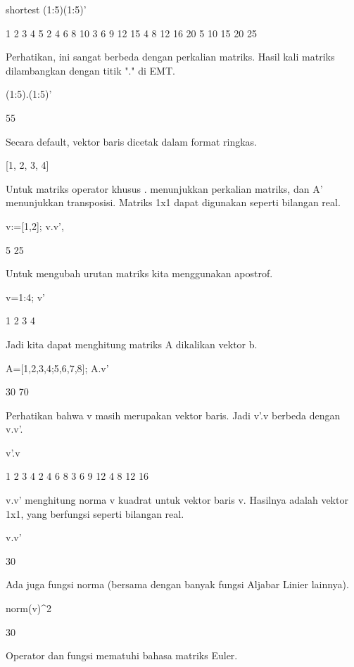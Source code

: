 \documentclass{article}
\begin{document}
\>shortest (1:5)\*(1:5)'


         1      2      3      4      5 
         2      4      6      8     10 
         3      6      9     12     15 
         4      8     12     16     20 
         5     10     15     20     25 

Perhatikan, ini sangat berbeda dengan perkalian matriks. Hasil kali
matriks dilambangkan dengan titik "." di EMT.


\>(1:5).(1:5)'


    55

Secara default, vektor baris dicetak dalam format ringkas.


\>[1,2,3,4]


    [1,  2,  3,  4]

Untuk matriks operator khusus . menunjukkan perkalian matriks, dan A'
menunjukkan transposisi. Matriks 1x1 dapat digunakan seperti bilangan
real.


\>v:=[1,2]; v.v', %


    5
    25

Untuk mengubah urutan matriks kita menggunakan apostrof.


\>v=1:4; v'


                1 
                2 
                3 
                4 

Jadi kita dapat menghitung matriks A dikalikan vektor b.


\>A=[1,2,3,4;5,6,7,8]; A.v'


               30 
               70 

Perhatikan bahwa v masih merupakan vektor baris. Jadi v'.v berbeda
dengan v.v'.


\>v'.v


                1             2             3             4 
                2             4             6             8 
                3             6             9            12 
                4             8            12            16 

v.v' menghitung norma v kuadrat untuk vektor baris v. Hasilnya adalah
vektor 1x1, yang berfungsi seperti bilangan real.


\>v.v'


    30

Ada juga fungsi norma (bersama dengan banyak fungsi Aljabar Linier
lainnya).


\>norm(v)^2


    30

Operator dan fungsi mematuhi bahasa matriks Euler.
\end{document}
